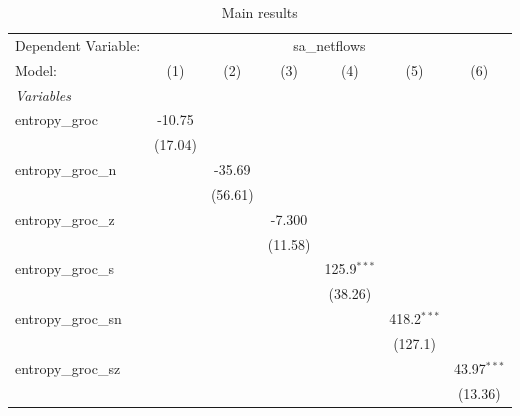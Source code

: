 
\begin{table}[htbp]
   \centering
   \caption{\label{tab:reg_sa_netflows_groc.tex} Main results}
   \begin{footnotesize}
      \begin{tabular}{lcccccc}
         \tabularnewline\midrule\midrule
         Dependent Variable: & \multicolumn{6}{c}{sa\_netflows}\\
         Model:              & (1)            & (2)            & (3)            & (4)            & (5)            & (6)\\
         \midrule \emph{Variables} &   &   &   &   &   &  \\
         entropy\_groc      & -10.75         &                &                &                &                &   \\
                             & (17.04)        &                &                &                &                &   \\
         entropy\_groc\_n  &                & -35.69         &                &                &                &   \\
                             &                & (56.61)        &                &                &                &   \\
         entropy\_groc\_z  &                &                & -7.300         &                &                &   \\
                             &                &                & (11.58)        &                &                &   \\
         entropy\_groc\_s  &                &                &                & 125.9$^{***}$  &                &   \\
                             &                &                &                & (38.26)        &                &   \\
         entropy\_groc\_sn &                &                &                &                & 418.2$^{***}$  &   \\
                             &                &                &                &                & (127.1)        &   \\
         entropy\_groc\_sz &                &                &                &                &                & 43.97$^{***}$\\
                             &                &                &                &                &                & (13.36)\\

\end{tabular}
\end{footnotesize}
\end{table}
